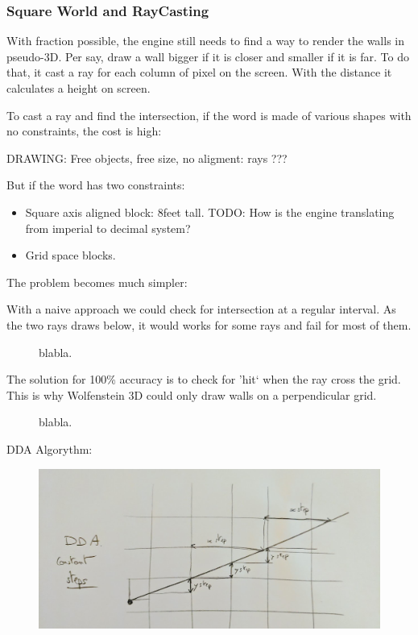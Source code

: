 \subsubsection{Square World and RayCasting}
With fraction possible, the engine still needs to find a way to render the walls in pseudo-3D. Per say, draw a wall bigger if it is closer and smaller if it is far. To do that, it cast a ray for each column of pixel on the screen. With the distance it calculates a height on screen.\\
\par
To cast a ray and find the intersection, if the word is made of various shapes with no constraints, the cost is high:\\
\par
DRAWING: Free objects, free size, no aligment: rays ???\\
\par
But if the word has two constraints:
\begin{itemize}
\item Square axis aligned block: 8feet tall. TODO: How is the engine translating from imperial to decimal system?
\item Grid space blocks.
\end{itemize}
\par
The problem becomes much simpler:\\
\par
\begin{figure}[H]
\centering
 
\end{figure}

With a naive approach we could check for intersection at a regular interval. As the two rays draws below, it would works for some rays and fail for most of them.
\begin{figure}[H]
\centering
 
 \caption{blabla.}
\end{figure}

The solution for 100\% accuracy is to check for 'hit` when the ray cross the grid. This is why Wolfenstein 3D could only draw walls on a perpendicular grid.
\begin{figure}[H]
\centering
 
 \caption{blabla.}
\end{figure}
\par
DDA Algorythm:
 \par
\begin{figure}[H]
  \centering
 \includegraphics[width=\textwidth]{imgs/dda_explainer.png}
\end{figure}
\par

